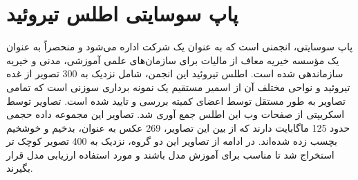 \section{پاپ سوسایتی اطلس تیروئید}\label{subsec:پاپ-سوسایتی}
پاپ سوسایتی، انجمنی است که به عنوان یک شرکت اداره می‌شود و منحصراً به عنوان یک مؤسسه خیریه معاف از مالیات برای سازمان‌های علمی آموزشی، مدنی و خیریه سازماندهی شده است.
اطلس تیروئید این انجمن\cite{papsocietyiamgeatlas}، شامل نزدیک به 300 تصویر از غده تیروئید و نواحی مختلف آن از اسمیر مستقیم یک نمونه برداری سوزنی است که تمامی تصاویر به طور مستقل توسط اعضای کمیته بررسی و تایید شده است.
تصاویر توسط اسکریپتی از صفحات وب این اطلس جمع آوری شد. تصاویر این مجموعه داده حجمی حدود 125 ماگابایت دارند که از بین این تصاویر، 269 عکس به عنوان، بدخیم و خوشخیم بچسب زده شده‌اند. در ادامه از تصاویر این دو گروه، نزدیک به 400 تصویر کوچک تر استخراج شد تا مناسب برای آموزش مدل باشند و مورد استفاده ارزیابی مدل قرار بگیرند.
